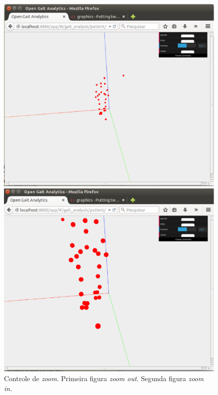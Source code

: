 \begin{figure}[H]
  \centering
  \begin{minipage}[b]{0.49\textwidth}
    \includegraphics[width=\textwidth]{figuras/tela13.eps}
  \end{minipage}
  \hfill
  \begin{minipage}[b]{0.49\textwidth}
    \includegraphics[width=\textwidth]{figuras/tela14.eps}
  \end{minipage}
  \caption[Controle de \emph{zoom}.]{Controle de \emph{zoom}. Primeira figura \emph{zoom out}. Segunda figura \emph{zoom in}.}
  \label{animacao3}
\end{figure}

